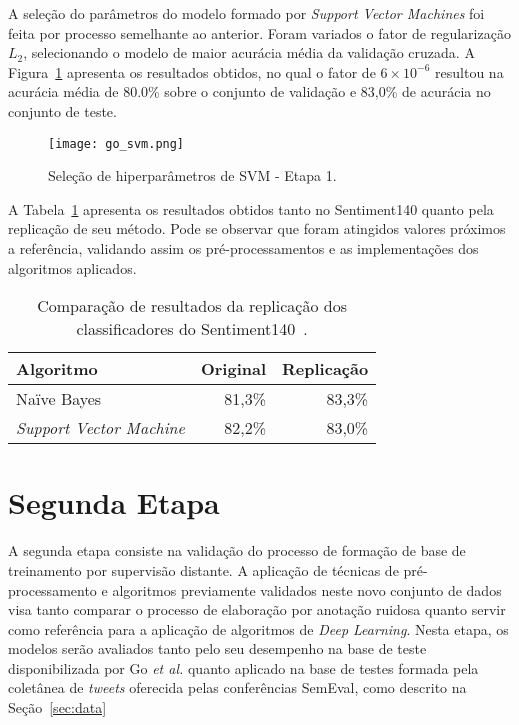 A seleção do parâmetros do modelo formado por \textit{Support Vector Machines} foi feita por processo semelhante ao
anterior.
Foram variados o fator de regularização $L_{2}$, selecionando o modelo de maior acurácia média da validação cruzada.
A Figura~\ref{fig:go_svm} apresenta os resultados obtidos, no qual o fator de $6 \times 10^{-6}$ resultou na acurácia
média de 80.0\% sobre o conjunto de validação e 83,0\% de acurácia no conjunto de teste.

\begin{figure}
\begin{center} {
    \begin{center}
    \texttt{[image: go\_svm.png]}
    \caption{Seleção de hiperparâmetros de SVM - Etapa 1.}
    \label{fig:go_svm}
    \end{center}
}
\end{center}
\end{figure}

A Tabela~\ref{tab:go_compara} apresenta os resultados obtidos tanto no Sentiment140 quanto pela replicação de
seu método.
Pode se observar que foram atingidos valores próximos a referência, validando assim os pré-processamentos e as
implementações dos algoritmos aplicados.

\begin{table}[h]
    \begin{center}
        \begin{tabular}{| l | r | r |}
        \hline
        \textbf{Algoritmo} & \textbf{Original} & \textbf{Replicação} \\ \hline
        Naïve Bayes & 81,3\% & 83,3\% \\ \hline
        \textit{Support Vector Machine} &  82,2\% & 83,0\% \\ \hline
        \end{tabular}
        \caption{Comparação de resultados da replicação dos classificadores do Sentiment140~\cite{go09}.}
        \label{tab:go_compara}
    \end{center}
\end{table}

\section{Segunda Etapa}

A segunda etapa consiste na validação do processo de formação de base de treinamento por supervisão distante.
A aplicação de técnicas de pré-processamento e algoritmos previamente validados neste novo conjunto de dados visa tanto
comparar o processo de elaboração por anotação ruidosa quanto servir como referência para a aplicação de algoritmos de
\textit{Deep Learning}.
Nesta etapa, os modelos serão avaliados tanto pelo seu desempenho na base de teste disponibilizada por Go
\textit{et al.} quanto aplicado na base de testes formada pela coletânea de \textit{tweets} oferecida pelas conferências
SemEval, como descrito na Seção~\ref{sec:data}

